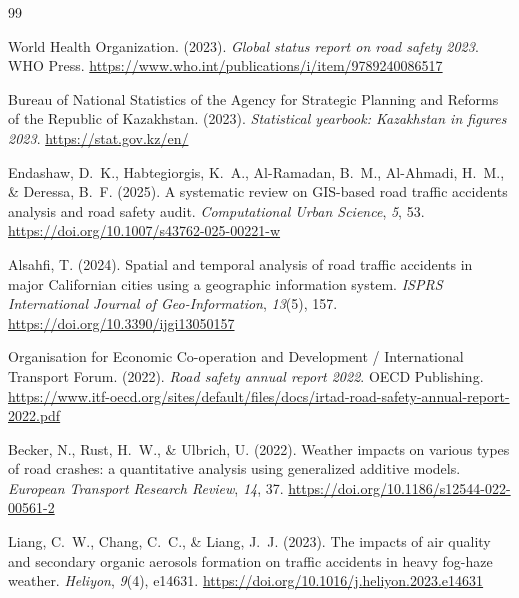 \documentclass[12pt,a4paper]{report}
\begin{document}
\begin{thebibliography}{99}

World Health Organization. (2023). \textit{Global status report on road
safety 2023}. WHO Press.
\href{https://www.who.int/publications/i/item/9789240086517}
{https://www.who.int/publications/i/item/9789240086517}

Bureau of National Statistics of the Agency for Strategic Planning and
Reforms of the Republic of Kazakhstan. (2023). \textit{Statistical
yearbook: Kazakhstan in figures 2023}.
\href{https://stat.gov.kz/en/}{https://stat.gov.kz/en/}

Endashaw, D.~K., Habtegiorgis, K.~A., Al-Ramadan, B.~M., Al-Ahmadi,
H.~M., \& Deressa, B.~F. (2025). A systematic review on GIS-based road
traffic accidents analysis and road safety audit.
\textit{Computational Urban Science}, \textit{5}, 53.
\href{https://doi.org/10.1007/s43762-025-00221-w}
{https://doi.org/10.1007/s43762-025-00221-w}

Alsahfi, T. (2024). Spatial and temporal analysis of road traffic
accidents in major Californian cities using a geographic information
system. \textit{ISPRS International Journal of Geo-Information},
\textit{13}(5), 157.
\href{https://doi.org/10.3390/ijgi13050157}
{https://doi.org/10.3390/ijgi13050157}

Organisation for Economic Co-operation and Development / International
Transport Forum. (2022). \textit{Road safety annual report 2022}.
OECD Publishing.
\href{https://www.itf-oecd.org/sites/default/files/docs/irtad-road-safety-annual-report-2022.pdf}
{https://www.itf-oecd.org/sites/default/files/docs/irtad-road-safety-annual-report-2022.pdf}

Becker, N., Rust, H.~W., \& Ulbrich, U. (2022). Weather impacts on
various types of road crashes: a quantitative analysis using generalized
additive models. \textit{European Transport Research Review},
\textit{14}, 37.
\href{https://doi.org/10.1186/s12544-022-00561-2}
{https://doi.org/10.1186/s12544-022-00561-2}

Liang, C.~W., Chang, C.~C., \& Liang, J.~J. (2023). The impacts of
air quality and secondary organic aerosols formation on traffic accidents
in heavy fog-haze weather. \textit{Heliyon}, \textit{9}(4), e14631.
\href{https://doi.org/10.1016/j.heliyon.2023.e14631}
{https://doi.org/10.1016/j.heliyon.2023.e14631}


\end{thebibliography}
\end{document}
